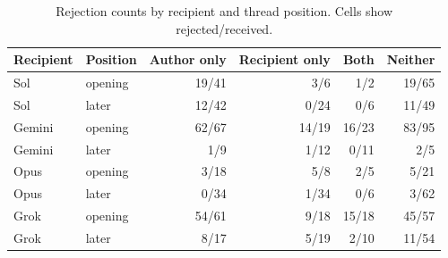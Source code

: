 \begin{longtable}{@{}llrrrr@{}}
\caption{Rejection counts by recipient and thread position. Cells show rejected/received.}\label{tab:strata}\\
\toprule Recipient & Position & Author only & Recipient only & Both & Neither\\\midrule\endhead
Sol & opening & 19/41 & 3/6 & 1/2 & 19/65\\
Sol & later & 12/42 & 0/24 & 0/6 & 11/49\\
Gemini & opening & 62/67 & 14/19 & 16/23 & 83/95\\
Gemini & later & 1/9 & 1/12 & 0/11 & 2/5\\
Opus & opening & 3/18 & 5/8 & 2/5 & 5/21\\
Opus & later & 0/34 & 1/34 & 0/6 & 3/62\\
Grok & opening & 54/61 & 9/18 & 15/18 & 45/57\\
Grok & later & 8/17 & 5/19 & 2/10 & 11/54\\
\bottomrule\end{longtable}
